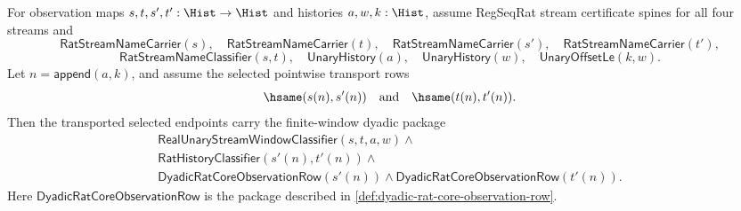\begin{theorem}
\label{thm:regseqrat-finite-window-dyadic-transport-package}
For observation maps $s,t,s',t':\Hist\to\Hist$ and histories $a,w,k:\Hist$,
assume RegSeqRat stream certificate spines for all four streams and
$$
\mathsf{RatStreamNameCarrier}(s),\quad
\mathsf{RatStreamNameCarrier}(t),\quad
\mathsf{RatStreamNameCarrier}(s'),\quad
\mathsf{RatStreamNameCarrier}(t'),
$$
$$
\mathsf{RatStreamNameClassifier}(s,t),\quad
\mathsf{UnaryHistory}(a),\quad
\mathsf{UnaryHistory}(w),\quad
\mathsf{UnaryOffsetLe}(k,w).
$$
Let $n=\mathsf{append}(a,k)$, and assume the selected pointwise transport rows
$$
\hsame(s(n),s'(n))
\quad\text{and}\quad
\hsame(t(n),t'(n)).
$$
Then the transported selected endpoints carry the finite-window dyadic package
$$
\begin{array}{l}
\mathsf{RealUnaryStreamWindowClassifier}(s,t,a,w)\land\\
\mathsf{RatHistoryClassifier}(s'(n),t'(n))\land\\
\mathsf{DyadicRatCoreObservationRow}(s'(n))\land
\mathsf{DyadicRatCoreObservationRow}(t'(n)).
\end{array}
$$
Here $\mathsf{DyadicRatCoreObservationRow}$ is the package described in
\autoref{def:dyadic-rat-core-observation-row}.
\end{theorem}
